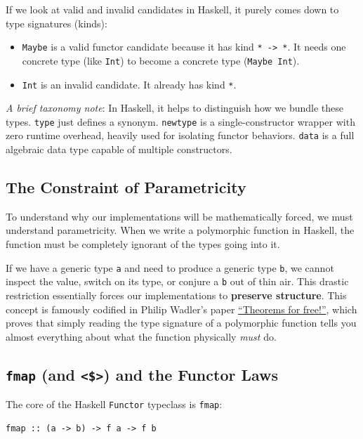 \documentclass[12pt,a4paper]{article}
\begin{document}
If we look at valid and invalid candidates in Haskell, it purely comes down to type signatures (kinds):
\begin{itemize}
    \item \texttt{Maybe} is a valid functor candidate because it has kind \texttt{* -> *}. It needs one concrete type (like \texttt{Int}) to become a concrete type (\texttt{Maybe Int}).
    \item \texttt{Int} is an invalid candidate. It already has kind \texttt{*}.
\end{itemize}

\textit{A brief taxonomy note}: In Haskell, it helps to distinguish how we bundle these types. \texttt{type} just defines a synonym. \texttt{newtype} is a single-constructor wrapper with zero runtime overhead, heavily used for isolating functor behaviors. \texttt{data} is a full algebraic data type capable of multiple constructors. 

\subsection{The Constraint of Parametricity}

To understand why our implementations will be mathematically forced, we must understand parametricity. When we write a polymorphic function in Haskell, the function must be completely ignorant of the types going into it. 

If we have a generic type \texttt{a} and need to produce a generic type \texttt{b}, we cannot inspect the value, switch on its type, or conjure a \texttt{b} out of thin air. This drastic restriction essentially forces our implementations to \textbf{preserve structure}. This concept is famously codified in Philip Wadler's paper \href{https://people.mpi-sws.org/~dreyer/tor/papers/wadler.pdf}{``Theorems for free!''}, which proves that simply reading the type signature of a polymorphic function tells you almost everything about what the function physically \textit{must} do.

\subsection{\texttt{fmap} (and \texttt{<\$>}) and the Functor Laws}

The core of the Haskell \texttt{Functor} typeclass is \texttt{fmap}:
\begin{lstlisting}
fmap :: (a -> b) -> f a -> f b
\end{lstlisting}
\end{document}
